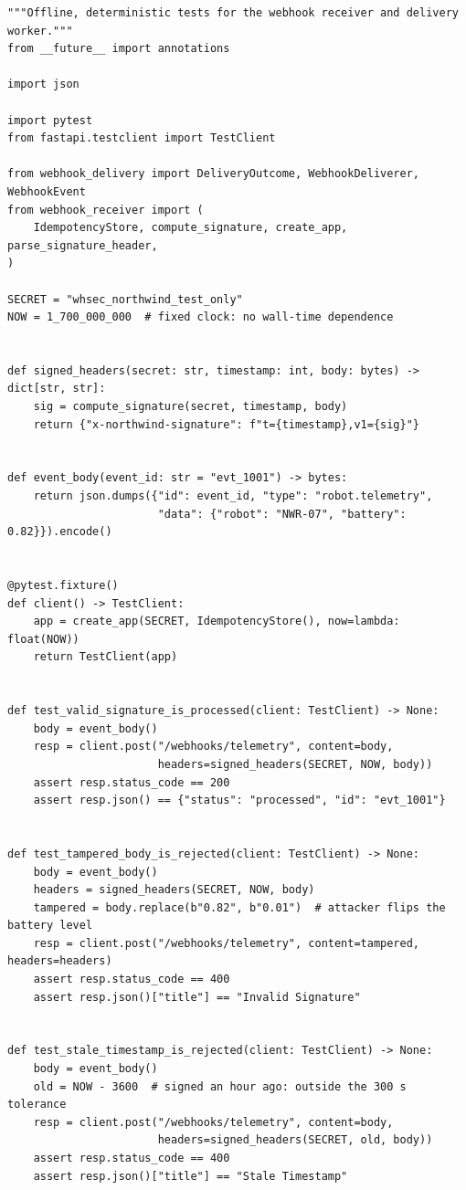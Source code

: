 \begin{verbatim}
"""Offline, deterministic tests for the webhook receiver and delivery worker."""
from __future__ import annotations

import json

import pytest
from fastapi.testclient import TestClient

from webhook_delivery import DeliveryOutcome, WebhookDeliverer, WebhookEvent
from webhook_receiver import (
    IdempotencyStore, compute_signature, create_app, parse_signature_header,
)

SECRET = "whsec_northwind_test_only"
NOW = 1_700_000_000  # fixed clock: no wall-time dependence


def signed_headers(secret: str, timestamp: int, body: bytes) -> dict[str, str]:
    sig = compute_signature(secret, timestamp, body)
    return {"x-northwind-signature": f"t={timestamp},v1={sig}"}


def event_body(event_id: str = "evt_1001") -> bytes:
    return json.dumps({"id": event_id, "type": "robot.telemetry",
                       "data": {"robot": "NWR-07", "battery": 0.82}}).encode()


@pytest.fixture()
def client() -> TestClient:
    app = create_app(SECRET, IdempotencyStore(), now=lambda: float(NOW))
    return TestClient(app)


def test_valid_signature_is_processed(client: TestClient) -> None:
    body = event_body()
    resp = client.post("/webhooks/telemetry", content=body,
                       headers=signed_headers(SECRET, NOW, body))
    assert resp.status_code == 200
    assert resp.json() == {"status": "processed", "id": "evt_1001"}


def test_tampered_body_is_rejected(client: TestClient) -> None:
    body = event_body()
    headers = signed_headers(SECRET, NOW, body)
    tampered = body.replace(b"0.82", b"0.01")  # attacker flips the battery level
    resp = client.post("/webhooks/telemetry", content=tampered, headers=headers)
    assert resp.status_code == 400
    assert resp.json()["title"] == "Invalid Signature"


def test_stale_timestamp_is_rejected(client: TestClient) -> None:
    body = event_body()
    old = NOW - 3600  # signed an hour ago: outside the 300 s tolerance
    resp = client.post("/webhooks/telemetry", content=body,
                       headers=signed_headers(SECRET, old, body))
    assert resp.status_code == 400
    assert resp.json()["title"] == "Stale Timestamp"



\end{verbatim}
